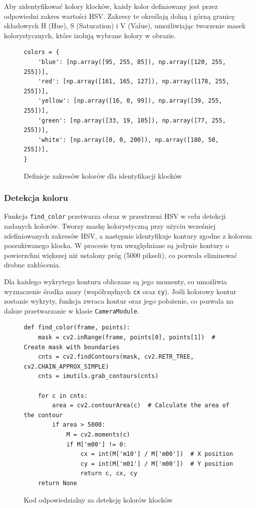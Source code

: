 Aby zidentyfikować kolory klocków, każdy kolor definiowany jest przez odpowiedni zakres wartości HSV. Zakresy te określają dolną i górną granicę składowych H (Hue), S (Saturation) i V (Value), umożliwiając tworzenie masek kolorystycznych, które izolują wybrane kolory w obrazie.

\begin{figure}[h!]
  \centering
  \begin{lstlisting}
colors = {
    'blue': [np.array([95, 255, 85]), np.array([120, 255, 255])],
    'red': [np.array([161, 165, 127]), np.array([178, 255, 255])],
    'yellow': [np.array([16, 0, 99]), np.array([39, 255, 255])],
    'green': [np.array([33, 19, 105]), np.array([77, 255, 255])],
    'white': [np.array([0, 0, 200]), np.array([180, 50, 255])],
}
  \end{lstlisting}
  \caption{Definicje zakresów kolorów dla identyfikacji klocków}
  \label{fig:color_definitions}
\end{figure}

\subsubsection{Detekcja koloru}

Funkcja \texttt{find\_color} przetwarza obraz w przestrzeni HSV w celu detekcji zadanych kolorów. Tworzy maskę kolorystyczną przy użyciu wcześniej zdefiniowanych zakresów HSV, a następnie identyfikuje kontury zgodne z kolorem poszukiwanego klocka. W procesie tym uwzględniane są jedynie kontury o powierzchni większej niż ustalony próg (5000 pikseli), co pozwala eliminować drobne zakłócenia.

Dla każdego wykrytego konturu obliczane są jego momenty, co umożliwia wyznaczenie środka masy (współrzędnych \texttt{cx} oraz \texttt{cy}). Jeśli kolorowy kontur zostanie wykryty, funkcja zwraca kontur oraz jego położenie, co pozwala na dalsze przetwarzanie w klasie \texttt{CameraModule}.

\begin{figure}[h!]
  \centering
  \begin{lstlisting}
def find_color(frame, points):
    mask = cv2.inRange(frame, points[0], points[1])  # Create mask with boundaries
    cnts = cv2.findContours(mask, cv2.RETR_TREE, cv2.CHAIN_APPROX_SIMPLE)
    cnts = imutils.grab_contours(cnts)

    for c in cnts:
        area = cv2.contourArea(c)  # Calculate the area of the contour
        if area > 5000:
            M = cv2.moments(c)
            if M['m00'] != 0:
                cx = int(M['m10'] / M['m00'])  # X position
                cy = int(M['m01'] / M['m00'])  # Y position
                return c, cx, cy
    return None
  \end{lstlisting}
  \caption{Kod odpowiedzialny za detekcję kolorów klocków}
  \label{fig:color_detection}
\end{figure}

